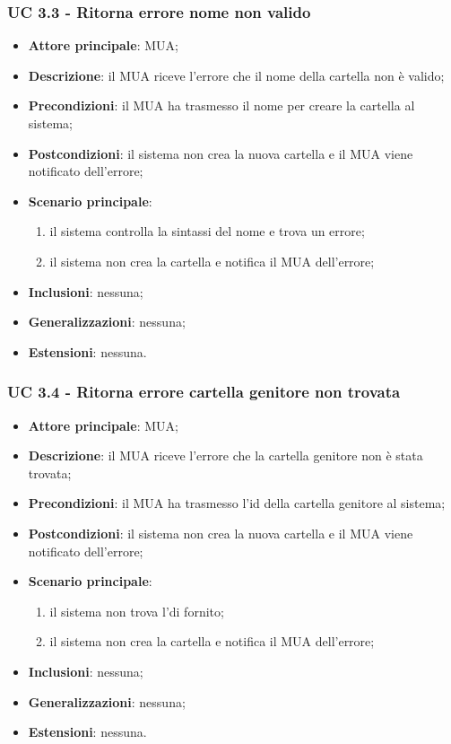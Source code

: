     \subsubsection{UC 3.3 - Ritorna errore nome non valido} \label{sec:UC3.3}
    \begin{itemize}
        \item \textbf{Attore principale}: MUA;
        \item \textbf{Descrizione}: il MUA riceve l'errore che il nome della cartella non è valido;
        \item \textbf{Precondizioni}:  il MUA ha trasmesso il nome per creare la cartella al sistema;
        \item \textbf{Postcondizioni}: il sistema non crea la nuova cartella e il MUA viene notificato dell'errore;
        \item \textbf{Scenario principale}:
            \begin{enumerate}
                \item il sistema controlla la sintassi del nome e trova un errore;
                \item il sistema non crea la cartella e notifica il MUA dell'errore;
            \end{enumerate}
        \item \textbf{Inclusioni}: nessuna;
        \item \textbf{Generalizzazioni}: nessuna;
        \item \textbf{Estensioni}: nessuna.
    \end{itemize}

    \subsubsection{UC 3.4 - Ritorna errore cartella genitore non trovata} \label{sec:UC3.4}
    \begin{itemize}
        \item \textbf{Attore principale}: MUA;
        \item \textbf{Descrizione}: il MUA riceve l'errore che la cartella genitore non è stata trovata;
        \item \textbf{Precondizioni}: il MUA ha trasmesso l'id della cartella genitore al sistema;
        \item \textbf{Postcondizioni}: il sistema non crea la nuova cartella e il MUA viene notificato dell'errore;
        \item \textbf{Scenario principale}:
            \begin{enumerate}
                \item il sistema non trova l'di fornito;
                \item il sistema non crea la cartella e notifica il MUA dell'errore;
            \end{enumerate}
        \item \textbf{Inclusioni}: nessuna;
        \item \textbf{Generalizzazioni}: nessuna;
        \item \textbf{Estensioni}: nessuna.
    \end{itemize}

